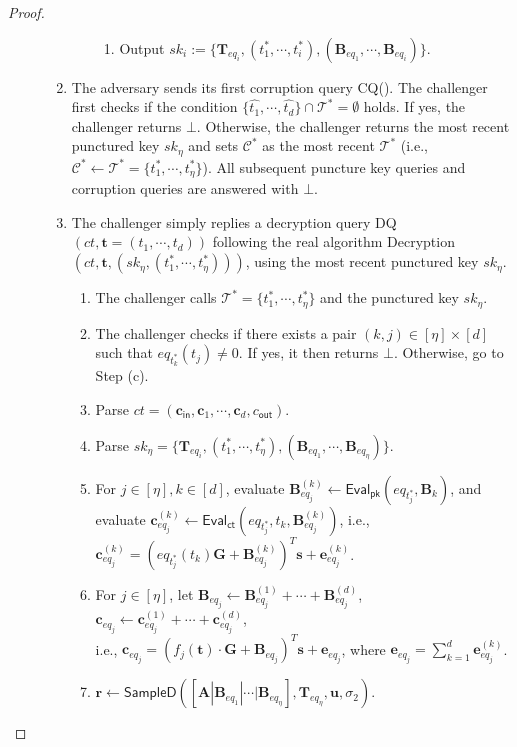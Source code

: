 \documentclass[runningheads,10pt]{llncs}
\begin{document}
\begin{proof}
\begin{description}
\begin{enumerate}
\begin{enumerate}
\begin{enumerate}
					\item Output $sk_{i}:=\{\textbf{T}_{eq_{i}},(t^*_1,\cdots, t^*_{i}), (\textbf{B}_{eq_{1}}, \cdots, \textbf{B}_{eq_{i}})\}$.
				\end{enumerate}
				\fi 
			\end{enumerate}
			\item The adversary sends its first corruption query CQ(). 
			The challenger first checks if the condition $\{\widehat{t_1}, \cdots, \widehat{t_d}\} \cap \mathcal{T}^*= \emptyset$ holds.  
			If yes, the challenger returns $\bot$.  
			Otherwise, the challenger returns the most recent punctured key $sk_\eta$ and 
			sets $\mathcal{C}^*$ as  the most recent $\mathcal{T}^*$ (i.e., $\mathcal{C}^* \leftarrow \mathcal{T}^*=\{t_1^*, \cdots, t^*_\eta\}$). 
			All subsequent puncture key queries and corruption queries are answered with $\bot$. 
			\item The challenger simply replies a decryption query DQ$(ct, \textbf{t}=(t_1, \cdots, t_d))$ following the real algorithm \textsf{Decryption}$(ct, \textbf{t}, (sk_\eta, (t^*_1, \cdots, t^*_{\eta})))$, using the most recent punctured key $sk_\eta$.
			\iffalse
			\begin{enumerate}
				\item The challenger calls $\mathcal{T}^*=\{t_1^*, \cdots, t^*_\eta\}$ and the punctured key $sk_\eta$. 
				\item  The challenger checks if there exists a pair $(k,j)\in [\eta]\times [d]$ such that $eq_{t^*_k}(t_j) \neq 0$. If yes, it then returns $\bot$. Otherwise, go to Step (c).
				\item  Parse $ct=(\textbf{c}_{\textsf{in}}, \textbf{c}_1, \cdots, \textbf{c}_{d}, c_{\textsf{out}}) $.
				\item Parse $sk_{\eta}=\{\textbf{T}_{eq_{i}},(t^*_1,\cdots, t^*_{\eta}), (\textbf{B}_{eq_{1}}, \cdots, \textbf{B}_{eq_{\eta}})\}$.
				\item For $j \in [\eta], k\in [d]$, evaluate $\textbf{B}_{eq_j}^{(k)} \leftarrow \textsf{Eval}_\textsf{pk}(eq_{t^*_{j}}, \textbf{B}_k)$, and evaluate $\textbf{c}_{eq_j}^{(k)} \leftarrow \textsf{Eval}_\textsf{ct}(eq_{t^*_{j}},  t_k, \textbf{B}_{eq_j}^{(k)})$, 
				i.e., $\textbf{c}_{eq_j}^{(k)}=(eq_{t^*_{j}}(t_k)\textbf{G}+\textbf{B}_{eq_j}^{(k)})^T \textbf{s}+\textbf{e}_{{eq_j}}^{(k)}$.
				\item For $j \in [\eta]$, let  $\textbf{B}_{eq_j} \leftarrow \textbf{B}_{eq_j}^{(1)}+\cdots +\textbf{B}_{eq_j}^{(d)}$, $\textbf{c}_{eq_j} \leftarrow \textbf{c}_{eq_j}^{(1)}+\cdots +\textbf{c}_{eq_j}^{(d)}$, \\
				i.e., $\textbf{c}_{eq_j}=\left(f_j(\textbf{t})\cdot \textbf{G}+\textbf{B}_{eq_j}\right)^T \textbf{s}+\textbf{e}_{{eq_j}}$, where $\textbf{e}_{{eq_j}}=\sum_{k=1}^{d}\textbf{e}_{{eq_j}}^{(k)}$.
				\item $\textbf{r} \leftarrow \textsf{SampleD}([\textbf{A} |\textbf{B}_{eq_{1}}|\cdots |\textbf{B}_{eq_{{\eta}}}], \textbf{T}_{eq_{{\eta}}}, \textbf{u}, \sigma_2)$.
				

\end{enumerate}
\end{enumerate}
\end{description}
\end{proof}
\end{document}
